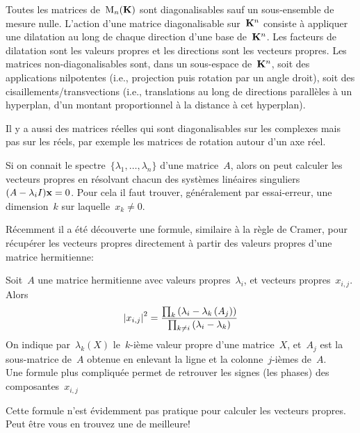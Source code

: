 \begin{proposition}
	Toutes les matrices de~$\mathrm{M}_n(\mathbf{K})$ sont diagonalisables sauf un
	sous-ensemble de mesure nulle.  L'action d'une matrice diagonalisable
	sur~$\mathbf{K}^n$ consiste à appliquer une dilatation au long de chaque direction
	d'une base de~$\mathbf{K}^n$.  Les facteurs de dilatation sont les
	valeurs propres et les directions sont les vecteurs
	propres.  Les matrices non-diagonalisables sont, dans un sous-espace
	de~$\mathbf{K}^n$, soit des applications nilpotentes (i.e., projection puis
	rotation par un angle droit), soit des cisaillements/transvections
	(i.e., translations au long de directions parallèles à un hyperplan, d'un
	montant proportionnel à la distance à cet hyperplan).
\end{proposition}

Il y a aussi des matrices réelles qui sont diagonalisables sur les complexes
mais pas sur les réels, par exemple les matrices de rotation autour d'un axe
réel.

Si on connait le spectre~$\{\lambda_1,\ldots,\lambda_n\}$ d'une matrice~$A$,
alors on peut calculer les vecteurs propres en résolvant chacun des systèmes
linéaires singuliers~$(A-\lambda_i I)\mathbf{x}=0$.  Pour cela il faut trouver,
généralement par essai-erreur, une dimension~$k$ sur laquelle~$x_k\neq0$.

Récemment il a été découverte une formule, similaire à la règle de Cramer,
pour récupérer les vecteurs propres directement à partir des valeurs propres
d'une matrice hermitienne:

\begin{theorem}
	Soit~$A$ une matrice hermitienne avec valeurs
	propres~$\lambda_i$, et vecteurs propres~$x_{i,j}$.  Alors
	\[
		\left|x_{i,j}\right|^2
		=
		\frac
		{\prod_k\left(\lambda_i-\lambda_k\left(A_j\right)\right)}
		{\prod_{k\neq i}\left(\lambda_i-\lambda_k\right)}
	\]
	On indique par~$\lambda_k(X)$ le~$k$-ième valeur propre d'une matrice~$X$,
	et~$A_j$ est la sous-matrice de~$A$ obtenue en enlevant la ligne et la
	colonne~$j$-ièmes de~$A$.\\
	Une formule plus compliquée permet de retrouver les signes (les
	phases) des composantes~$x_{i,j}$
\end{theorem}

Cette formule n'est évidemment pas pratique pour calculer les vecteurs
propres.  Peut être vous en trouvez une de meilleure!

